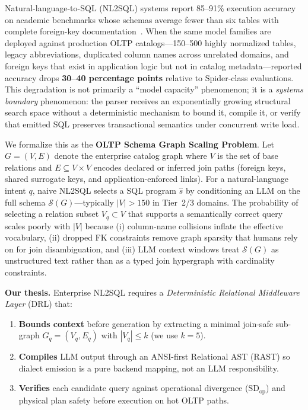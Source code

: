 \documentclass[twocolumn]{svjour3}
\begin{document}
Natural-language-to-SQL (NL2SQL) systems report 85--91\% execution accuracy on academic benchmarks whose schemas average fewer than six tables with complete foreign-key documentation~\cite{yu2018spider,li2023can}.
When the same model families are deployed against production OLTP catalogs---150--500 highly normalized tables, legacy abbreviations, duplicated column names across unrelated domains, and foreign keys that exist in application logic but not in catalog metadata---reported accuracy drops \textbf{30--40 percentage points} relative to Spider-class evaluations.
This degradation is not primarily a ``model capacity'' phenomenon; it is a \emph{systems boundary} phenomenon: the parser receives an exponentially growing structural search space without a deterministic mechanism to bound it, compile it, or verify that emitted SQL preserves transactional semantics under concurrent write load.

We formalize this as the \textbf{OLTP Schema Graph Scaling Problem}.
Let $G=(V,E)$ denote the enterprise catalog graph where $V$ is the set of base relations and $E\subseteq V\times V$ encodes declared or inferred join paths (foreign keys, shared surrogate keys, and application-enforced links).
For a natural-language intent $q$, naive NL2SQL selects a SQL program $\hat{s}$ by conditioning an LLM on the full schema $\mathcal{S}(G)$---typically $|V|>150$ in Tier~2/3 domains.
The probability of selecting a relation subset $V_q\subset V$ that supports a semantically correct query scales poorly with $|V|$ because (i) column-name collisions inflate the effective vocabulary, (ii) dropped FK constraints remove graph sparsity that humans rely on for join disambiguation, and (iii) LLM context windows treat $\mathcal{S}(G)$ as unstructured text rather than as a typed join hypergraph with cardinality constraints.

\textbf{Our thesis.} Enterprise NL2SQL requires a \emph{Deterministic Relational Middleware Layer} (DRL) that:
\begin{enumerate}[label=(\roman*)]
  \item \textbf{Bounds context} before generation by extracting a minimal join-safe sub-graph $G_q=(V_q,E_q)$ with $|V_q|\le k$ (we use $k{=}5$).
  \item \textbf{Compiles} LLM output through an ANSI-first Relational AST (RAST) so dialect emission is a pure backend mapping, not an LLM responsibility.
  \item \textbf{Verifies} each candidate query against operational divergence ($\text{SD}_{\text{op}}$) and physical plan safety before execution on hot OLTP paths.
\end{enumerate}
\end{document}
